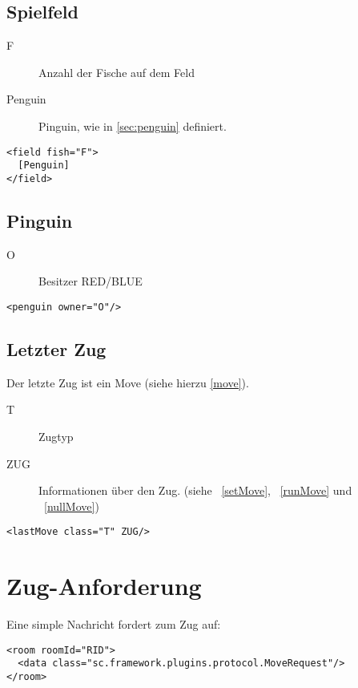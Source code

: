 \documentclass[12pt,a4paper, ngerman, oneside]{scrartcl}
\begin{document}
\subsection{\label{sec:field}Spielfeld}
\begin{description}
\item[F] Anzahl der Fische auf dem Feld
\item[Penguin] Pinguin, wie in \ref{sec:penguin} definiert.
\end{description}
\begin{verbatim}
<field fish="F">
  [Penguin]
</field>
\end{verbatim}

\subsection{\label{sec:penguin}Pinguin}
\begin{description}
\item[O] Besitzer RED/BLUE
\end{description}
\begin{verbatim}
<penguin owner="O"/>
\end{verbatim}



\subsection{\label{lastmove}Letzter Zug}
Der letzte Zug ist ein Move (siehe hierzu \ref{move}).
\begin{description}
\item[T] Zugtyp
\item[ZUG] Informationen über den Zug. (siehe ~\ref{setMove}, ~\ref{runMove} und ~\ref{nullMove})
\end{description}
\begin{verbatim}
<lastMove class="T" ZUG/>
\end{verbatim}

\section{\label{moverequest}Zug-Anforderung}
Eine simple Nachricht fordert zum Zug auf:
\begin{verbatim}
<room roomId="RID">
  <data class="sc.framework.plugins.protocol.MoveRequest"/>
</room>
\end{verbatim}
\end{document}
